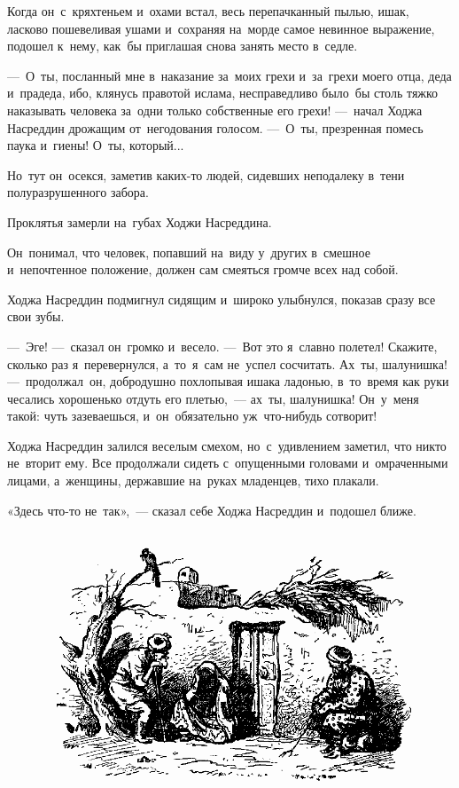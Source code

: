 \documentclass[12pt,a4paper]{book}
\begin{document}
Когда он~с~кряхтеньем и~охами встал, весь перепачканный пылью, ишак, ласково пошевеливая ушами и~сохраняя на~морде самое невинное выражение, подошел к~нему, как~бы приглашая снова занять место в~седле.

—~О~ты, посланный мне в~наказание за~моих грехи и~за~грехи моего отца, деда и~прадеда, ибо, клянусь правотой ислама, несправедливо было~бы столь тяжко наказывать человека за~одни только собственные его грехи! —~начал Ходжа Насреддин дрожащим от~негодования голосом. —~О~ты, презренная помесь паука и~гиены! О~ты, который...

Но~тут он~осекся, заметив каких-то людей, сидевших неподалеку в~тени полуразрушенного забора.

Проклятья замерли на~губах Ходжи Насреддина.

Он~понимал, что человек, попавший на~виду у~других в~смешное и~непочтенное положение, должен сам смеяться громче всех над собой.

Ходжа Насреддин подмигнул сидящим и~широко улыбнулся, показав сразу все свои зубы.

—~Эге! —~сказал он~громко и~весело. —~Вот это я~славно полетел! Скажите, сколько раз я~перевернулся, а~то~я~сам не~успел сосчитать. Ах~ты, шалунишка! —~продолжал~он, добродушно похлопывая ишака ладонью, в~то~время как руки чесались хорошенько отдуть его плетью,~— ах~ты, шалунишка! Он~у~меня такой: чуть зазеваешься, и~он~обязательно уж~что-нибудь сотворит!

Ходжа Насреддин залился веселым смехом, но~с~удивлением заметил, что никто не~вторит ему. Все продолжали сидеть с~опущенными головами и~омраченными лицами, а~женщины, державшие на~руках младенцев, тихо плакали.

«Здесь что-то не~так»,~— сказал себе Ходжа Насреддин и~подошел ближе.

\begin{figure}[h]
\centering
\includegraphics[width=\textwidth]{3.png}
\end{figure}
\end{document}
